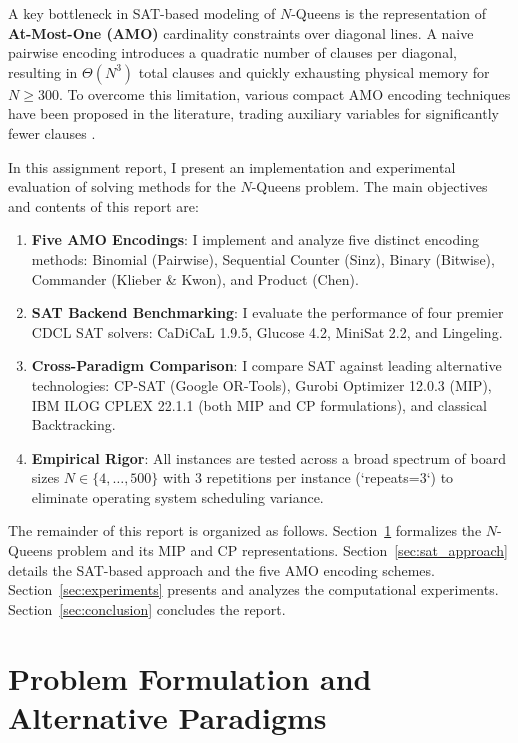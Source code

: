 \documentclass[a4paper,fleqn]{cas-sc}
\begin{document}
A key bottleneck in SAT-based modeling of $N$-Queens is the representation of \textbf{At-Most-One (AMO)} cardinality constraints over diagonal lines. A naive pairwise encoding introduces a quadratic number of clauses per diagonal, resulting in $\Theta(N^3)$ total clauses and quickly exhausting physical memory for $N \ge 300$. To overcome this limitation, various compact AMO encoding techniques have been proposed in the literature, trading auxiliary variables for significantly fewer clauses \cite{prestwich2009cnf,sinz2005towards,chen2010new}.

In this assignment report, I present an implementation and experimental evaluation of solving methods for the $N$-Queens problem. The main objectives and contents of this report are:
\begin{enumerate}[label=(\arabic*),noitemsep]
    \item \textbf{Five AMO Encodings}: I implement and analyze five distinct encoding methods: Binomial (Pairwise), Sequential Counter (Sinz), Binary (Bitwise), Commander (Klieber \& Kwon), and Product (Chen).
    \item \textbf{SAT Backend Benchmarking}: I evaluate the performance of four premier CDCL SAT solvers: CaDiCaL 1.9.5, Glucose 4.2, MiniSat 2.2, and Lingeling.
    \item \textbf{Cross-Paradigm Comparison}: I compare SAT against leading alternative technologies: CP-SAT (Google OR-Tools), Gurobi Optimizer 12.0.3 (MIP), IBM ILOG CPLEX 22.1.1 (both MIP and CP formulations), and classical Backtracking.
    \item \textbf{Empirical Rigor}: All instances are tested across a broad spectrum of board sizes $N \in \{4, \dots, 500\}$ with 3 repetitions per instance (`repeats=3`) to eliminate operating system scheduling variance.
\end{enumerate}

The remainder of this report is organized as follows. Section~\ref{sec:formulation} formalizes the $N$-Queens problem and its MIP and CP representations. Section~\ref{sec:sat_approach} details the SAT-based approach and the five AMO encoding schemes. Section~\ref{sec:experiments} presents and analyzes the computational experiments. Section~\ref{sec:conclusion} concludes the report.

\section{Problem Formulation and Alternative Paradigms}
\label{sec:formulation}
\end{document}
